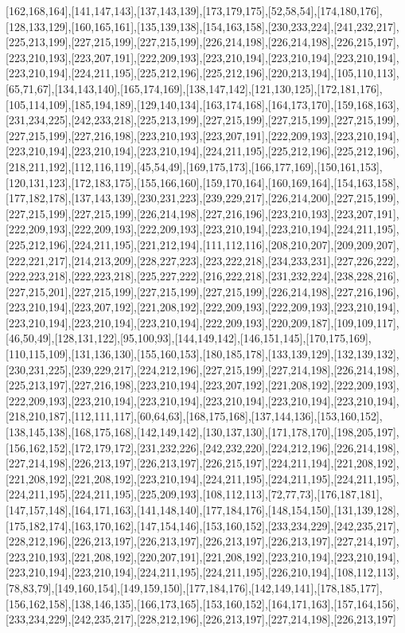 [162,168,164],[141,147,143],[137,143,139],[173,179,175],[52,58,54],[174,180,176],[128,133,129],[160,165,161],[135,139,138],[154,163,158],[230,233,224],[241,232,217],[225,213,199],[227,215,199],[227,215,199],[226,214,198],[226,214,198],[226,215,197],[223,210,193],[223,207,191],[222,209,193],[223,210,194],[223,210,194],[223,210,194],[223,210,194],[224,211,195],[225,212,196],[225,212,196],[220,213,194],[105,110,113],[65,71,67],[134,143,140],[165,174,169],[138,147,142],[121,130,125],[172,181,176],[105,114,109],[185,194,189],[129,140,134],[163,174,168],[164,173,170],[159,168,163],[231,234,225],[242,233,218],[225,213,199],[227,215,199],[227,215,199],[227,215,199],[227,215,199],[227,216,198],[223,210,193],[223,207,191],[222,209,193],[223,210,194],[223,210,194],[223,210,194],[223,210,194],[224,211,195],[225,212,196],[225,212,196],[218,211,192],[112,116,119],[45,54,49],[169,175,173],[166,177,169],[150,161,153],[120,131,123],[172,183,175],[155,166,160],[159,170,164],[160,169,164],[154,163,158],[177,182,178],[137,143,139],[230,231,223],[239,229,217],[226,214,200],[227,215,199],[227,215,199],[227,215,199],[226,214,198],[227,216,196],[223,210,193],[223,207,191],[222,209,193],[222,209,193],[222,209,193],[223,210,194],[223,210,194],[224,211,195],[225,212,196],[224,211,195],[221,212,194],[111,112,116],[208,210,207],[209,209,207],[222,221,217],[214,213,209],[228,227,223],[223,222,218],[234,233,231],[227,226,222],[222,223,218],[222,223,218],[225,227,222],[216,222,218],[231,232,224],[238,228,216],[227,215,201],[227,215,199],[227,215,199],[227,215,199],[226,214,198],[227,216,196],[223,210,194],[223,207,192],[221,208,192],[222,209,193],[222,209,193],[223,210,194],[223,210,194],[223,210,194],[223,210,194],[222,209,193],[220,209,187],[109,109,117],[46,50,49],[128,131,122],[95,100,93],[144,149,142],[146,151,145],[170,175,169],[110,115,109],[131,136,130],[155,160,153],[180,185,178],[133,139,129],[132,139,132],[230,231,225],[239,229,217],[224,212,196],[227,215,199],[227,214,198],[226,214,198],[225,213,197],[227,216,198],[223,210,194],[223,207,192],[221,208,192],[222,209,193],[222,209,193],[223,210,194],[223,210,194],[223,210,194],[223,210,194],[223,210,194],[218,210,187],[112,111,117],[60,64,63],[168,175,168],[137,144,136],[153,160,152],[138,145,138],[168,175,168],[142,149,142],[130,137,130],[171,178,170],[198,205,197],[156,162,152],[172,179,172],[231,232,226],[242,232,220],[224,212,196],[226,214,198],[227,214,198],[226,213,197],[226,213,197],[226,215,197],[224,211,194],[221,208,192],[221,208,192],[221,208,192],[223,210,194],[224,211,195],[224,211,195],[224,211,195],[224,211,195],[224,211,195],[225,209,193],[108,112,113],[72,77,73],[176,187,181],[147,157,148],[164,171,163],[141,148,140],[177,184,176],[148,154,150],[131,139,128],[175,182,174],[163,170,162],[147,154,146],[153,160,152],[233,234,229],[242,235,217],[228,212,196],[226,213,197],[226,213,197],[226,213,197],[226,213,197],[227,214,197],[223,210,193],[221,208,192],[220,207,191],[221,208,192],[223,210,194],[223,210,194],[223,210,194],[223,210,194],[224,211,195],[224,211,195],[226,210,194],[108,112,113],[78,83,79],[149,160,154],[149,159,150],[177,184,176],[142,149,141],[178,185,177],[156,162,158],[138,146,135],[166,173,165],[153,160,152],[164,171,163],[157,164,156],[233,234,229],[242,235,217],[228,212,196],[226,213,197],[227,214,198],[226,213,197]